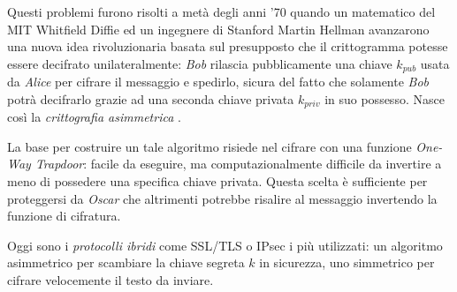\documentclass[twoside,symmetric,justified,openany,nobib]{tufte-book}
\newcommand{\A}{\textit{Alice}\xspace}
\newcommand{\B}{\textit{Bob}\xspace}
\newcommand{\OS}{\textit{Oscar}\xspace}
\begin{document}
\noindent
Questi problemi furono risolti a metà degli anni '70 quando un matematico del MIT Whitfield Diffie ed un ingegnere di Stanford Martin Hellman avanzarono una
nuova idea rivoluzionaria basata sul presupposto che il crittogramma potesse essere decifrato unilateralmente: \B rilascia pubblicamente una chiave $k_{pub}$ usata da \A per cifrare il messaggio e spedirlo, sicura del fatto che solamente \B potrà decifrarlo grazie ad una seconda chiave privata $k_{priv}$ in suo possesso. Nasce così la \textit{crittografia asimmetrica} \cite{diffie-hellman}.

La base per costruire un tale algoritmo risiede nel cifrare con una funzione \textit{One-Way Trapdoor}: facile da eseguire, ma computazionalmente difficile da invertire a meno di possedere una specifica chiave privata. Questa scelta è sufficiente per proteggersi da \OS che altrimenti potrebbe risalire al messaggio invertendo la funzione di cifratura.

Oggi sono i \textit{protocolli ibridi} come SSL/TLS o IPsec i più utilizzati: un algoritmo asimmetrico per scambiare la chiave segreta $k$ in sicurezza, uno simmetrico per cifrare velocemente il testo da inviare.

\newpage
\end{document}
